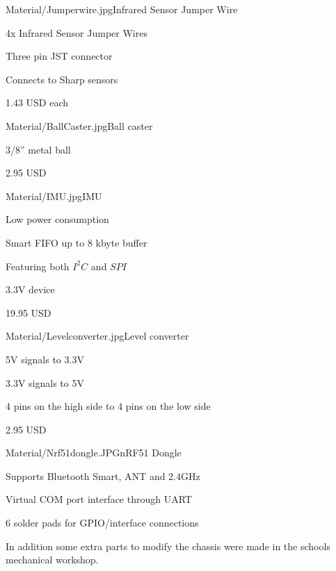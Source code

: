\begin{material}{Material/Jumperwire.jpg}{Infrared Sensor Jumper Wire}
\item 4x Infrared Sensor Jumper Wires
\item Three pin JST connector
\item Connects to Sharp sensors
\item 1.43 USD each
\end{material}

\begin{material}{Material/BallCaster.jpg}{Ball caster}
\item 3/8'' metal ball
\item 2.95 USD
\end{material}

\newpage
{}
\begin{material}{Material/IMU.jpg}{IMU}
\item Low power consumption
\item Smart FIFO up to 8 kbyte buffer
\item Featuring both $I^2C$ and $SPI$
\item 3.3V device
\item 19.95 USD
\end{material}

\begin{material}{Material/Levelconverter.jpg}{Level converter}
\item 5V signals to 3.3V 
\item 3.3V signals to 5V
\item 4 pins on the high side to 4 pins on the low side
\item 2.95 USD
\end{material}

\begin{material}{Material/Nrf51dongle.JPG}{nRF51 Dongle}
\item Supports Bluetooth Smart, ANT and 2.4GHz
\item Virtual COM port interface through UART
\item 6 solder pads for GPIO/interface connections
\end{material}

In addition some extra parts to modify the chassis were made in the schools mechanical workshop.